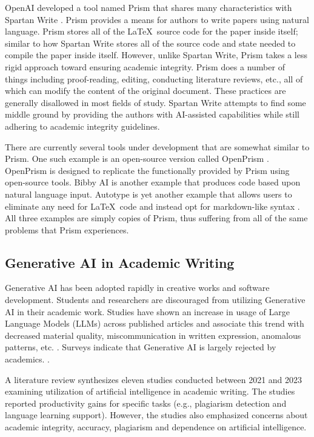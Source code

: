 OpenAI developed a tool named Prism that shares many characteristics with Spartan Write \cite{openai_prism}. 
Prism provides a means for authors to write papers using natural language. 
Prism stores all of the \LaTeX\ source code for the paper inside itself; similar to how Spartan Write stores all of the source code and state needed to compile the paper inside itself. 
However, unlike Spartan Write, Prism takes a less rigid approach toward ensuring academic integrity. 
Prism does a number of things including proof-reading, editing, conducting literature reviews, etc., all of which can modify the content of the original document. 
These practices are generally disallowed in most fields of study. 
Spartan Write attempts to find some middle ground by providing the authors with AI-assisted capabilities while still adhering to academic integrity guidelines.

There are currently several tools under development that are somewhat similar to Prism. 
One such example is an open-source version called OpenPrism \cite{github_openprism}. 
OpenPrism is designed to replicate the functionally provided by Prism using open-source tools. 
Bibby AI \cite{bibby_ai} is another example that produces code based upon natural language input. 
Autotype is yet another example that allows users to eliminate any need for \LaTeX\ code and instead opt for markdown-like syntax \cite{autype}. 
All three examples are simply copies of Prism, thus suffering from all of the same problems that Prism experiences.

\subsection{Generative AI in Academic Writing}

Generative AI has been adopted rapidly in creative works and software development. 
Students and researchers are discouraged from utilizing Generative AI in their academic work. 
Studies have shown an increase in usage of Large Language Models (LLMs) across published articles and associate this trend with decreased material quality, miscommunication in written expression, anomalous patterns, etc. \cite{kobak_delving_2025}. 
Surveys indicate that Generative AI is largely rejected by academics. \cite{kwon_survey_2025}.

A literature review synthesizes eleven studies conducted between 2021 and 2023 examining utilization of artificial intelligence in academic writing. 
The studies reported productivity gains for specific tasks (e.g., plagiarism detection and language learning support). 
However, the studies also emphasized concerns about academic integrity, accuracy, plagiarism and dependence on artificial intelligence.

